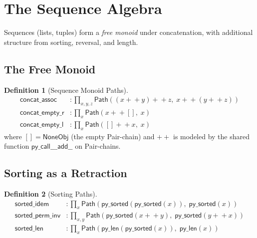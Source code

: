 \documentclass[11pt,a4paper]{report}
\theoremstyle{definition}
\newtheorem{definition}{Definition}[chapter]
\theoremstyle{plain}
\newcommand{\Path}{\mathsf{Path}}
\begin{document}
\section{The Sequence Algebra}

Sequences (lists, tuples) form a \emph{free monoid} under
concatenation, with additional structure from sorting, reversal,
and length.

\subsection{The Free Monoid}

\begin{definition}[Sequence Monoid Paths]
\begin{align}
  \mathsf{concat\_assoc} &: \prod_{x,y,z}
    \Path((x +\!\!+ y) +\!\!+ z,\;
          x +\!\!+ (y +\!\!+ z))
    \tag{S1} \\
  \mathsf{concat\_empty\_r} &: \prod_x
    \Path(x +\!\!+ [],\; x)
    \tag{S2} \\
  \mathsf{concat\_empty\_l} &: \prod_x
    \Path([] +\!\!+ x,\; x)
    \tag{S3}
\end{align}
where $[] = \mathsf{NoneObj}$ (the empty Pair-chain) and
$+\!\!+$ is modeled by the shared function $\mathsf{py\_call\_\_\_add\_\_}$
on Pair-chains.
\end{definition}

\subsection{Sorting as a Retraction}

\begin{definition}[Sorting Paths]
\begin{align}
  \mathsf{sorted\_idem} &: \prod_x
    \Path(\mathsf{py\_sorted}(\mathsf{py\_sorted}(x)),\;
          \mathsf{py\_sorted}(x))
    \tag{S4} \\
  \mathsf{sorted\_perm\_inv} &: \prod_{x,y}
    \Path(\mathsf{py\_sorted}(x +\!\!+ y),\;
          \mathsf{py\_sorted}(y +\!\!+ x))
    \tag{S5} \\
  \mathsf{sorted\_len} &: \prod_x
    \Path(\mathsf{py\_len}(\mathsf{py\_sorted}(x)),\;
          \mathsf{py\_len}(x))
    \tag{S6}
\end{align}
\end{definition}
\end{document}
